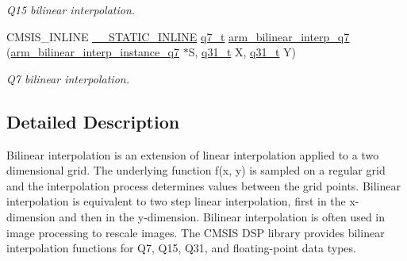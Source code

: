 \begin{DoxyCompactItemize}
\begin{DoxyCompactList}\small\item\em Q15 bilinear interpolation. \end{DoxyCompactList}\item 
C\+M\+S\+I\+S\+\_\+\+I\+N\+L\+I\+NE \mbox{\hyperlink{cmsis__iccarm_8h_aba87361bfad2ae52cfe2f40c1a1dbf9c}{\+\_\+\+\_\+\+S\+T\+A\+T\+I\+C\+\_\+\+I\+N\+L\+I\+NE}} \mbox{\hyperlink{arm__math_8h_ae541b6f232c305361e9b416fc9eed263}{q7\+\_\+t}} \mbox{\hyperlink{group___bilinear_interpolate_ga0a986d4a01039914a9d6e81e9a4ccda0}{arm\+\_\+bilinear\+\_\+interp\+\_\+q7}} (\mbox{\hyperlink{structarm__bilinear__interp__instance__q7}{arm\+\_\+bilinear\+\_\+interp\+\_\+instance\+\_\+q7}} $\ast$S, \mbox{\hyperlink{arm__math_8h_adc89a3547f5324b7b3b95adec3806bc0}{q31\+\_\+t}} X, \mbox{\hyperlink{arm__math_8h_adc89a3547f5324b7b3b95adec3806bc0}{q31\+\_\+t}} Y)
\begin{DoxyCompactList}\small\item\em Q7 bilinear interpolation. \end{DoxyCompactList}\end{DoxyCompactItemize}


\subsection{Detailed Description}
Bilinear interpolation is an extension of linear interpolation applied to a two dimensional grid. The underlying function {\ttfamily f(x, y)} is sampled on a regular grid and the interpolation process determines values between the grid points. Bilinear interpolation is equivalent to two step linear interpolation, first in the x-\/dimension and then in the y-\/dimension. Bilinear interpolation is often used in image processing to rescale images. The C\+M\+S\+IS D\+SP library provides bilinear interpolation functions for Q7, Q15, Q31, and floating-\/point data types.

